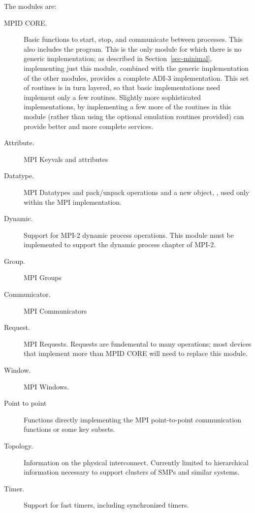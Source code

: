 \documentclass[dvipdfm]{article}
\begin{document}
The modules are:
\begin{description}
\item[MPID CORE.] Basic functions to start, stop, and communicate
between processes.  This also includes the  program.
This is the only module for which there is no generic implementation; as
described in Section~\ref{sec-minimal}, implementing just this module,
combined with the generic implementation of the other modules, provides a
complete ADI-3 implementation.  This set of routines is in turn
layered, so that basic implementations need implement only a few
routines.  Slightly more sophisticated implementations, by
implementing a few more of the routines in this module (rather than
using the optional emulation routines provided) can provide better and
more complete services.

\item[Attribute.] MPI Keyvals and attributes

\item[Datatype.] MPI Datatypes and pack/unpack operations and a new
object, , used only within the MPI implementation.

\item[Dynamic.] Support for MPI-2 dynamic process operations.  This
module must be implemented to support the dynamic process chapter of MPI-2.

\item[Group.] MPI Groups

\item[Communicator.] MPI Communicators

\item[Request.] MPI Requests.  Requests are fundemental to many
operations; most devices that implement more than MPID CORE will need
to replace this module.

\item[Window.] MPI Windows.

\item[Point to point]Functions directly implementing the MPI
point-to-point communication functions or some key subsets.

\item[Topology.]Information on the physical interconnect.  Currently
limited to hierarchical information necessary to support clusters of
SMPs and similar systems.

\item[Timer.] Support for fast timers, including synchronized timers.


\end{description}
\end{document}
